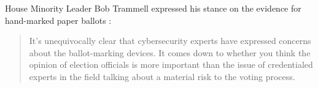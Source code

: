 \documentclass[runningheads]{llncs}
\begin{document}
House Minority Leader Bob Trammell expressed his stance on the evidence
for hand-marked paper ballots \cite{niesse_bill_2019}:
 
\begin{quote}
It's unequivocally clear that cybersecurity experts have expressed concerns about the ballot-marking devices.
It comes down to whether you think the opinion of election officials \textellipsis
is more important than the issue of credentialed experts in the field talking about a material risk to the voting process.
\end{quote}
 



\end{document}
